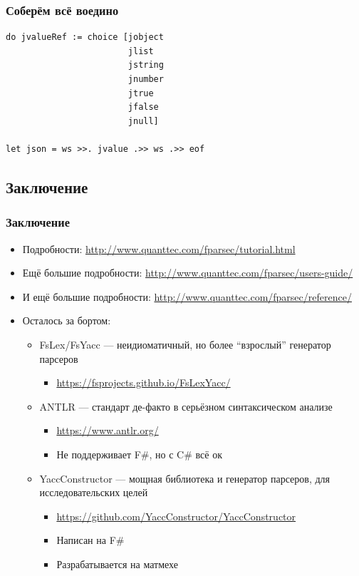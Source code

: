 \documentclass[xetex,mathserif,serif]{beamer}
\begin{document}
	\begin{frame}[fragile]
		\frametitle{Соберём всё воедино}
		\begin{verbatim}
do jvalueRef := choice [jobject
                        jlist
                        jstring
                        jnumber
                        jtrue
                        jfalse
                        jnull]

let json = ws >>. jvalue .>> ws .>> eof
		\end{verbatim}
	\end{frame}

	\subsection{Заключение}

	\begin{frame}
		\frametitle{Заключение}
		\begin{small}
			\begin{itemize}
				\item Подробности: \url{http://www.quanttec.com/fparsec/tutorial.html}
				\item Ещё большие подробности: \url{http://www.quanttec.com/fparsec/users-guide/}
				\item И ещё большие подробности: \url{http://www.quanttec.com/fparsec/reference/}
				\item Осталось за бортом:
					\begin{itemize}
						\item FsLex/FsYacc --- неидиоматичный, но более ``взрослый'' генератор парсеров
							\begin{itemize}
								\item \url{https://fsprojects.github.io/FsLexYacc/}
							\end{itemize}
						\item ANTLR --- стандарт де-факто в серьёзном синтаксическом анализе
							\begin{itemize}
								\item \url{https://www.antlr.org/}
								\item Не поддерживает F\#, но с C\# всё ок
							\end{itemize}
						\item YaccConstructor --- мощная библиотека и генератор парсеров, для исследовательских целей
							\begin{itemize}
								\item \url{https://github.com/YaccConstructor/YaccConstructor}
								\item Написан на F\#
								\item Разрабатывается на матмехе
							\end{itemize}
					\end{itemize}
			\end{itemize}
		\end{small}
	\end{frame}
\end{document}
